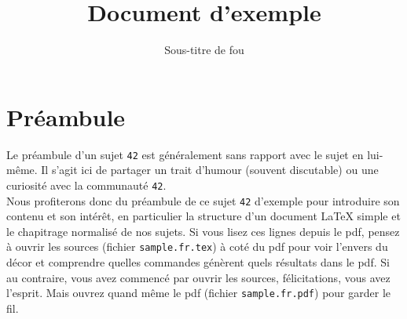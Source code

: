 \documentclass{42-fr}
\begin{document}
                           \title{Document d'exemple}
                          \subtitle{Sous-titre de fou}


\maketitle

\tableofcontents


\chapter{Préambule}

    Le pr\'eambule d'un sujet \texttt{42} est g\'en\'eralement sans
    rapport avec le sujet en lui-m\^eme. Il s'agit ici de partager
    un trait d'humour (souvent discutable) ou une curiosit\'e avec la
    communaut\'e \texttt{42}.\\










    Nous profiterons donc du pr\'eambule de ce sujet \texttt{42}
    d'exemple pour introduire son contenu et son int\'er\^et, en
    particulier la structure d'un document LaTeX simple et le
    chapitrage normalis\'e de nos sujets. Si vous lisez ces lignes
    depuis le pdf, pensez \`a ouvrir les sources (fichier
    \texttt{sample.fr.tex}) \`a cot\'e du pdf pour voir l'envers du
    d\'ecor et comprendre quelles commandes g\'en\`erent quels
    r\'esultats dans le pdf. Si au contraire, vous avez commenc\'e par
    ouvrir les sources, f\'elicitations, vous avez l'esprit. Mais
    ouvrez quand m\^eme le pdf (fichier \texttt{sample.fr.pdf}) pour
    garder le fil.\\
\end{document}
